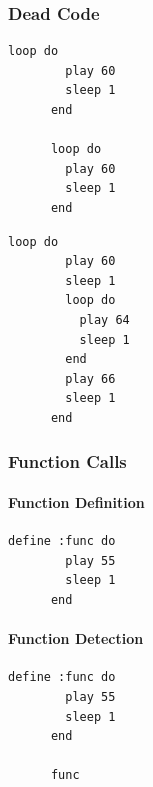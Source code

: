 \documentclass[11pt, abstracton, twoside]{scrartcl}
\begin{document}
\subsubsection{Dead Code}
\begin{minipage}{\textwidth}
	\begin{lstlisting}[style = sonicpi]
      loop do
        play 60
        sleep 1
      end

      loop do
        play 60
        sleep 1
      end
	\end{lstlisting}
\end{minipage}

\begin{minipage}{\textwidth}
	\begin{lstlisting}[style = sonicpi]
      loop do
        play 60
        sleep 1
        loop do
          play 64
          sleep 1
        end
        play 66
        sleep 1
      end
	\end{lstlisting}
\end{minipage}

\subsubsection{Function Calls}
\paragraph{Function Definition}
\begin{minipage}{\textwidth}
	\begin{lstlisting}[style = sonicpi]
      define :func do
        play 55
        sleep 1
      end
	\end{lstlisting}
\end{minipage}

\paragraph{Function Detection}
\begin{minipage}{\textwidth}
	\begin{lstlisting}[style = sonicpi]
      define :func do
        play 55
        sleep 1
      end

      func
	\end{lstlisting}
\end{minipage}
\end{document}

